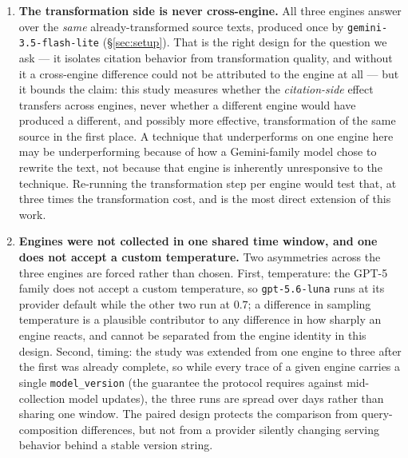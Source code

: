 \documentclass[11pt,a4paper]{article}
\begin{document}
\begin{enumerate}[leftmargin=*]
\item \textbf{The transformation side is never cross-engine.} All three
  engines answer over the \emph{same} already-transformed source texts,
  produced once by \texttt{gemini-3.5-flash-lite} (\S\ref{sec:setup}). That
  is the right design for the question we ask --- it isolates citation
  behavior from transformation quality, and without it a cross-engine
  difference could not be attributed to the engine at all --- but it bounds
  the claim: this study measures whether the \emph{citation-side} effect
  transfers across engines, never whether a different engine would have
  produced a different, and possibly more effective, transformation of the
  same source in the first place. A technique that underperforms on one
  engine here may be underperforming because of how a Gemini-family model
  chose to rewrite the text, not because that engine is inherently
  unresponsive to the technique. Re-running the transformation step per
  engine would test that, at three times the transformation cost, and is
  the most direct extension of this work.

\item \textbf{Engines were not collected in one shared time window, and one
  does not accept a custom temperature.} Two asymmetries across the three
  engines are forced rather than chosen. First, temperature: the GPT-5
  family does not accept a custom temperature, so \texttt{gpt-5.6-luna}
  runs at its provider default while the other two run at $0.7$; a
  difference in sampling temperature is a plausible contributor to any
  difference in how sharply an engine reacts, and cannot be separated from
  the engine identity in this design. Second, timing: the study was
  extended from one engine to three after the first was already complete,
  so while every trace of a given engine carries a single
  \texttt{model\_version} (the guarantee the protocol requires against
  mid-collection model updates), the three runs are spread over days rather
  than sharing one window. The paired design protects the comparison from
  query-composition differences, but not from a provider silently changing
  serving behavior behind a stable version string.


\end{enumerate}
\end{document}
